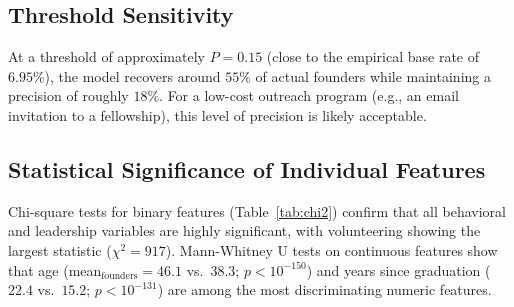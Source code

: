 \documentclass[10pt,twocolumn]{article}
\begin{document}
\subsection{Threshold Sensitivity}
\label{sec:threshold}

At a threshold of approximately $P = 0.15$ (close to the empirical base rate of
$6.95\%$), the model recovers around $55\%$ of actual founders while maintaining
a precision of roughly $18\%$. For a low-cost outreach program (e.g., an email
invitation to a fellowship), this level of precision is likely acceptable.

\subsection{Statistical Significance of Individual Features}

Chi-square tests for binary features (Table~\ref{tab:chi2}) confirm that all
behavioral and leadership variables are highly significant, with volunteering
showing the largest statistic ($\chi^2 = 917$). Mann-Whitney U tests on
continuous features show that age (mean$_\text{founders} = 46.1$ vs.\ $38.3$;
$p < 10^{-150}$) and years since graduation ($22.4$ vs.\ $15.2$;
$p < 10^{-131}$) are among the most discriminating numeric features.

\begin{table}[H]
\centering
\caption{Chi-square tests for binary features vs.\ \texttt{founded\_nonprofit}.}
\label{tab:chi2}
\end{table}
\end{document}
